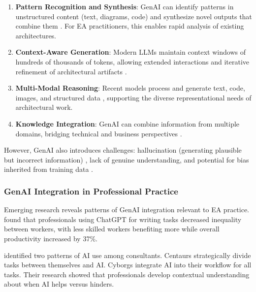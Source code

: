 \begin{enumerate}
      \item \textbf{Pattern Recognition and Synthesis}: GenAI can identify
            patterns in unstructured content (text, diagrams, code) and
            synthesize novel outputs that combine them
            \parencite{brynjolfsson_generative_2025}. For EA practitioners, this
            enables rapid analysis of existing architectures.
      \item \textbf{Context-Aware Generation}: Modern LLMs maintain context
            windows of hundreds of thousands of tokens, allowing extended
            interactions and iterative refinement of architectural artifacts
            \parencite{kanbach_genai_2024, banh_affordance_genai_ea_2025}.
      \item \textbf{Multi-Modal Reasoning}: Recent models process and generate
            text, code, images, and structured data
            \parencite{kanbach_genai_2024}, supporting the diverse
            representational needs of architectural work.
      \item \textbf{Knowledge Integration}: GenAI can combine information from
            multiple domains, bridging technical and business perspectives
            \parencite{banh_affordance_genai_ea_2025}.
\end{enumerate}

However, GenAI also introduces challenges: hallucination (generating plausible
but incorrect information) \parencite{zhang_sirens_2023}, lack of genuine
understanding, and potential for bias inherited from training data
\parencite{bender_dangers_2021}.

\subsubsection{GenAI Integration in Professional Practice}

Emerging research reveals patterns of GenAI integration relevant to EA practice.
\textcite{noy_experimental_2023} found that professionals using ChatGPT for
writing tasks decreased inequality between workers, with less skilled workers
benefiting more while overall productivity increased by 37\%.

\textcite{dellacqua_navigating_2023} identified two patterns of AI use among
consultants. Centaurs strategically divide tasks between themselves and AI.
Cyborgs integrate AI into their workflow for all tasks. Their research showed
that professionals develop contextual understanding about when AI helps versus
hinders.

